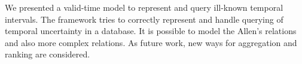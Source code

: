 We presented a valid-time model to represent and query ill-known temporal intervals. The framework tries to correctly represent and handle querying of temporal uncertainty in a database. It is possible to model the Allen's relations and also more complex relations. As future work, new ways for aggregation and ranking are considered. 
